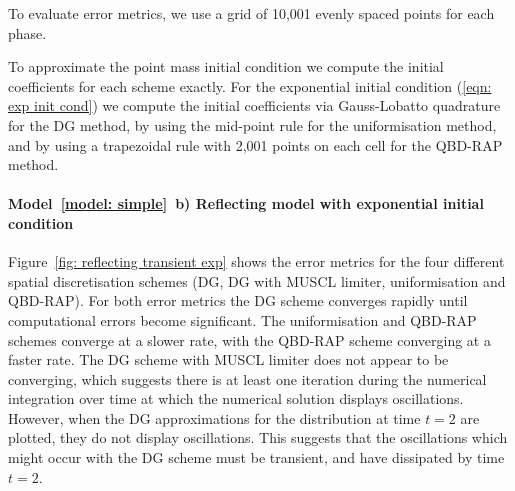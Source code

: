 To evaluate error metrics, we use a grid of 10,001 evenly spaced points for each phase. 

To approximate the point mass initial condition we compute the initial coefficients for each scheme exactly. For the exponential initial condition (\ref{eqn: exp init cond}) we compute the initial coefficients via Gauss-Lobatto quadrature for the DG method, by using the mid-point rule for the uniformisation method, and by using a trapezoidal rule with 2,001 points on each cell for the QBD-RAP method. 

\paragraph{Model~\ref{model: simple}~b) Reflecting model with exponential initial condition}
Figure~\ref{fig: reflecting transient exp} shows the error metrics for the four different spatial discretisation schemes (DG, DG with MUSCL limiter, uniformisation and QBD-RAP). For both error metrics the DG scheme converges rapidly until computational errors become significant. The uniformisation and QBD-RAP schemes converge at a slower rate, with the QBD-RAP scheme converging at a faster rate. The DG scheme with MUSCL limiter does not appear to be converging, which suggests there is at least one iteration during the numerical integration over time at which the numerical solution displays oscillations. However, when the DG approximations for the distribution at time \(t=2\) are plotted, they do not display oscillations. This suggests that the oscillations which might occur with the DG scheme must be transient, and have dissipated by time \(t=2\).%

